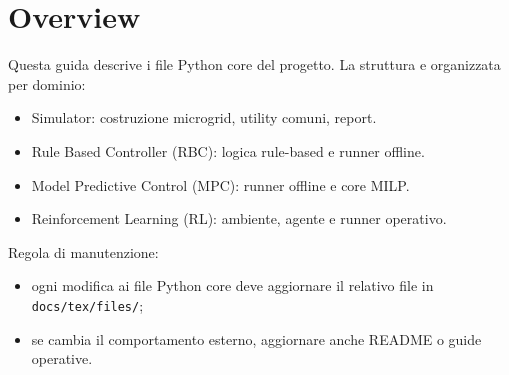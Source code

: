 \chapter{Overview}

Questa guida descrive i file Python core del progetto.
La struttura e organizzata per dominio:

\begin{itemize}[leftmargin=1.2cm]
\item Simulator: costruzione microgrid, utility comuni, report.
\item Rule Based Controller (RBC): logica rule-based e runner offline.
\item Model Predictive Control (MPC): runner offline e core MILP.
\item Reinforcement Learning (RL): ambiente, agente e runner operativo.
\end{itemize}

Regola di manutenzione:

\begin{itemize}[leftmargin=1.2cm]
\item ogni modifica ai file Python core deve aggiornare il relativo file in \texttt{docs/tex/files/};
\item se cambia il comportamento esterno, aggiornare anche README o guide operative.
\end{itemize}
